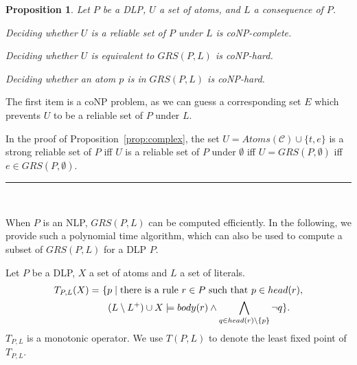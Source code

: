\documentclass{article}
\newenvironment{tight_itemize}{
\begin{itemize}
   \setlength{\itemsep}{0pt}%
  \setlength{\topsep}{0pt}%
  \setlength{\partopsep}{0pt}%
  \setlength{\parskip}{0pt}%
  \setlength{\parsep}{0pt}%
}{\end{itemize}}
\newtheorem{proposition}{Proposition}
\newenvironment{proofs}{{\bf Proof Sketch:}}{\rule{2mm}{2mm}\\[-.5em] }
\newcommand{\Atom}{Atom\!s}
\newcommand{\GRS}{G\!R\!S}
\newcommand{\GSRS}{G\!S\!R\!S}
\newcommand{\GWRS}{G\!W\!R\!S}
\begin{document}
\begin{proposition}
  Let $P$ be a DLP, $U$ a set of atoms, and $L$ a consequence of $P$.
  \begin{tight_itemize}
    \item Deciding whether $U$ is a reliable set of $P$ under $L$ is coNP-complete.
    \item Deciding whether $U$ is equivalent to $\GRS(P, L)$  is coNP-hard.
    \item Deciding whether an atom $p$ is in $\GRS(P, L)$  is coNP-hard.
  \end{tight_itemize}
\end{proposition}
\begin{proofs}
    The first item is a coNP problem, as we can guess a corresponding set $E$ which prevents $U$ to be a reliable set of $P$ under $L$.

  In the proof of Proposition~\ref{prop:complex}, the set $U = \Atom(\mathcal{C})\cup \{t, e\}$ is a strong reliable set of $P$ if{f} $U$ is a reliable set of $P$ under $\emptyset$ if{f} $U = \GRS(P, \emptyset)$ if{f} $e\in \GRS(P, \emptyset)$.
\end{proofs}


When $P$ is an NLP, $\GRS(P, L)$ can be computed efficiently.
In the following, we provide such a polynomial time algorithm, which can also be used to compute a subset of $\GRS(P, L)$ for a DLP $P$.



Let $P$ be a DLP, $X$ a set of atoms and $L$ a set of literals.
\begin{align*}
T_{P, L}(X) = &\ \{p\mid \text{there is a rule $r\in P$ such that $p\in head(r)$,}\\
  &\ \hspace{.2cm} (L\setminus L^+)\cup X\models body(r) \land \bigwedge_{q\in head(r)\setminus \{p\}} \neg q\}.
\end{align*}
$T_{P, L}$ is a monotonic operator. We use $T(P, L)$ to denote the least fixed point of $T_{P, L}$.
\end{document}
